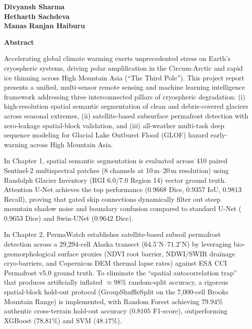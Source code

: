 \documentclass[12pt,a4paper]{report}
\begin{document}
\vspace{1.5cm}
\noindent
\hfill \textbf{Divyansh Sharma}\\
\hfill \textbf{Hetharth Sachdeva}\\
\hfill \textbf{Manas Ranjan Haiburu}

\newpage
\thispagestyle{plain}
\begin{center}
    {\LARGE \textbf{Abstract}}\\[0.8cm]
\end{center}

Accelerating global climate warming exerts unprecedented stress on Earth's cryospheric systems, driving polar amplification in the Circum-Arctic and rapid ice thinning across High Mountain Asia (``The Third Pole''). This project report presents a unified, multi-sensor remote sensing and machine learning intelligence framework addressing three interconnected pillars of cryospheric degradation: (i) high-resolution spatial semantic segmentation of clean and debris-covered glaciers across seasonal extremes, (ii) satellite-based subsurface permafrost detection with zero-leakage spatial-block validation, and (iii) all-weather multi-task deep sequence modeling for Glacial Lake Outburst Flood (GLOF) hazard early-warning across High Mountain Asia.

In Chapter 1, spatial semantic segmentation is evaluated across 410 paired Sentinel-2 multispectral patches (8 channels at 10\,m--20\,m resolution) using Randolph Glacier Inventory (RGI 6.0/7.0 Region 14) vector ground truth. Attention U-Net achieves the top performance ($0.9668$ Dice, $0.9357$ IoU, $0.9813$ Recall), proving that gated skip connections dynamically filter out steep mountain shadow noise and boundary confusion compared to standard U-Net ($0.9653$ Dice) and Swin-UNet ($0.9642$ Dice).

In Chapter 2, PermaWatch establishes satellite-based subsoil permafrost detection across a 29,294-cell Alaska transect ($64.5^\circ\text{N}$--$71.2^\circ\text{N}$) by leveraging bio-geomorphological surface proxies (NDVI root barrier, NDWI/SWIR drainage cryo-barriers, and Copernicus DEM thermal lapse rates) against ESA CCI Permafrost v5.0 ground truth. To eliminate the ``spatial autocorrelation trap'' that produces artificially inflated $\approx 98\%$ random-split accuracy, a rigorous spatial-block hold-out protocol (GroupShuffleSplit on the 7,000-cell Brooks Mountain Range) is implemented, with Random Forest achieving $79.94\%$ authentic cross-terrain hold-out accuracy ($0.8105$ F1-score), outperforming XGBoost ($78.81\%$) and SVM ($48.17\%$).
\end{document}

